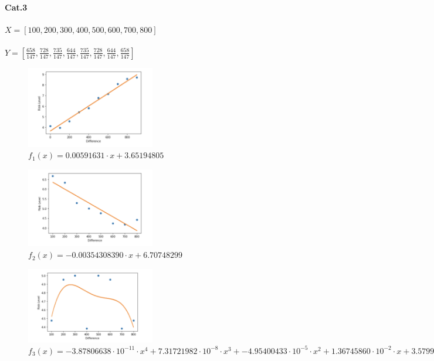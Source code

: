 \paragraph{Cat.3}\par
$X=[100,200,300,400,500,600,700,800]$\\ \\
$Y=[\frac{658}{147},\frac{728}{147},\frac{735}{147},\frac{644}{147},\frac{735}{147},\frac{728}{147},\frac{644}{147},\frac{658}{147}]$
\begin{figure}[h]
    \centering
    \includegraphics[width=0.5\textwidth]{Bilder/risk_level_diffrence_200steps}
    \caption{$f_1(x)=0.00591631\cdot x+3.65194805$}
    \label{fig:meine-grafik}
\end{figure}
\begin{figure}[h]
    \centering
    \includegraphics[width=0.5\textwidth]{Bilder/risk_level_diffrence_100steps}
    \caption{$f_2(x)=-0.00354308390\cdot x+6.70748299$}
    \label{fig:meine-grafik}
\end{figure}
\begin{figure}[h]
    \centering
    \includegraphics[width=0.5\textwidth]{Bilder/risk_level_diffrence_nonlinear}
    \caption{$f_3(x)=-3.87806638\cdot 10^{-11}\cdot x^4+7.31721982\cdot 10^{-8}\cdot x^3+ -4.95400433\cdot 10^{-5} \cdot x^2+ 1.36745860 \cdot 10^{-2} \cdot x+3.57993197$}
    \label{fig:meine-grafik}
\end{figure}
